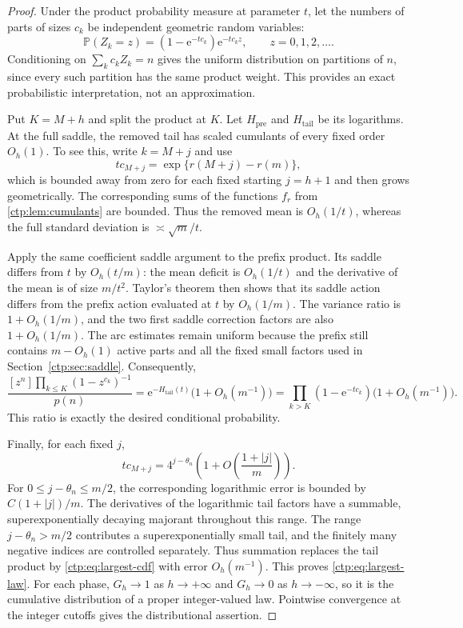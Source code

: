 \documentclass[11pt,a4paper]{article}
\numberwithin{equation}{section}
\theoremstyle{definition}
\theoremstyle{remark}
\newcommand{\e}{\mathrm e}
\newcommand{\PP}{\mathbb P}
\begin{document}
\begin{proof}
Under the product probability measure at parameter $t$, let the numbers
of parts of sizes $c_k$ be independent geometric random variables:
\[
 \PP(Z_k=z)=(1-\e^{-tc_k})\e^{-tc_k z},\qquad z=0,1,2,\ldots.
\]
Conditioning on $\sum_k c_kZ_k=n$ gives the uniform distribution on
partitions of $n$, since every such partition has the same product
weight. This provides an exact probabilistic interpretation, not an
approximation.

Put $K=M+h$ and split the product at $K$. Let $H_\mathrm{pre}$ and
$H_\mathrm{tail}$ be its logarithms. At the full saddle, the removed tail
has scaled cumulants of every fixed order $O_h(1)$. To see this, write
$k=M+j$ and use
\[
 tc_{M+j}=\exp\{r(M+j)-r(m)\},
\]
which is bounded away from zero for each fixed starting $j=h+1$ and
then grows geometrically. The corresponding sums of the functions
$f_r$ from \cref{ctp:lem:cumulants} are bounded. Thus the removed mean is
$O_h(1/t)$, whereas the full standard deviation is $\asymp\sqrt m/t$.

Apply the same coefficient saddle argument to the prefix product. Its
saddle differs from $t$ by $O_h(t/m)$: the mean deficit is $O_h(1/t)$
and the derivative of the mean is of size $m/t^2$. Taylor's theorem
then shows that its saddle action differs from the prefix action
evaluated at $t$ by $O_h(1/m)$. The variance ratio is $1+O_h(1/m)$,
and the two first saddle correction factors are also $1+O_h(1/m)$.
The arc estimates remain uniform because the prefix still contains
$m-O_h(1)$ active parts and all the fixed small factors used in
Section~\ref{ctp:sec:saddle}. Consequently,
\[
 \frac{[z^n]\prod_{k\leq K}(1-z^{c_k})^{-1}}{p(n)}
 =\e^{-H_\mathrm{tail}(t)}\bigl(1+O_h(m^{-1})\bigr)
 =\prod_{k>K}(1-\e^{-tc_k})\bigl(1+O_h(m^{-1})\bigr).
\]
This ratio is exactly the desired conditional probability.

Finally, for each fixed $j$,
\[
 tc_{M+j}=4^{j-\theta_n}
 \left(1+O\left(\frac{1+|j|}{m}\right)\right).
\]
For $0\leq j-\theta_n\leq m/2$, the corresponding logarithmic
error is bounded by $C(1+|j|)/m$. The derivatives of the logarithmic
tail factors have a summable, superexponentially decaying majorant
throughout this range. The range $j-\theta_n>m/2$ contributes a
superexponentially small tail, and the finitely many negative indices
are controlled separately. Thus summation replaces the tail product
by \eqref{ctp:eq:largest-cdf} with error $O_h(m^{-1})$. This proves \eqref{ctp:eq:largest-law}.
For each phase, $G_h\to1$ as $h\to+\infty$ and $G_h\to0$ as
$h\to-\infty$, so it is the cumulative distribution of a proper
integer-valued law. Pointwise convergence at the integer cutoffs gives
the distributional assertion.
\end{proof}
\end{document}
